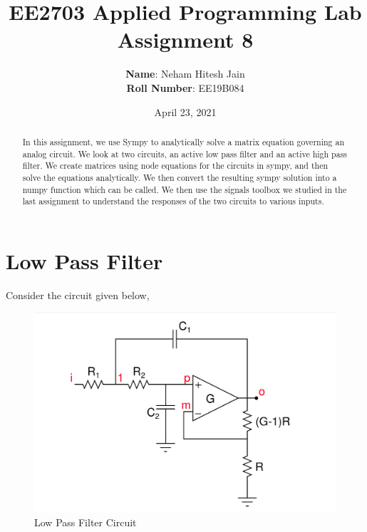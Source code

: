 \documentclass{article}
\title{EE2703 Applied Programming Lab \\ Assignment 8}
\author{
  \textbf{Name}: Neham Hitesh Jain\\
  \textbf{Roll Number}: EE19B084
}\date{April 23, 2021}
\begin{document}
\maketitle
\newpage

\begin{abstract}
    In this assignment, we use Sympy to analytically solve a matrix equation
    governing an analog circuit. We look at two circuits, an active low pass
    filter and an active high pass filter. We create matrices using node
    equations for the circuits in sympy, and then solve the equations
    analytically. We then convert the resulting sympy solution into a numpy
    function which can be called. We then use the signals toolbox we studied
    in the last assignment to understand the responses of the two circuits
    to various inputs.
\end{abstract}


\section*{Low Pass Filter}
Consider the circuit given below,


\begin{figure}[!tbh]
   	\centering
   	\includegraphics[scale=0.1]{plots/low_pass.png}   
   	\caption{Low Pass Filter Circuit}
   	\label{fig:Figure_1}
   \end{figure}
\end{document}
